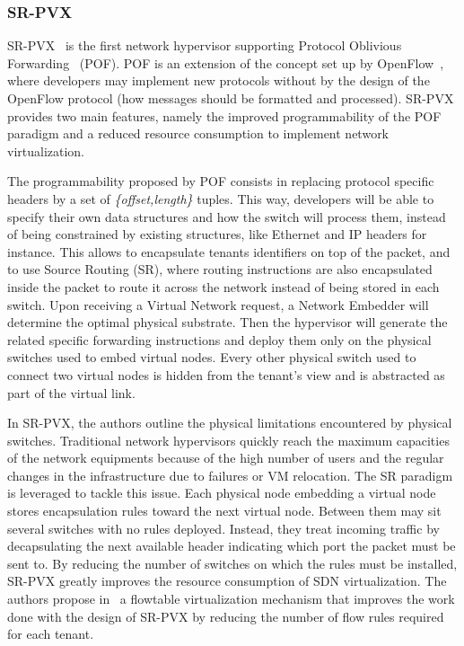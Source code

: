 \subsubsection{SR-PVX}
SR-PVX~\cite{PVX-Li2017} is the first network hypervisor supporting Protocol Oblivious Forwarding~\cite{pof-song2013} (POF). POF is an extension of the concept set up by OpenFlow~\cite{Openflow-McKeown2008}, where developers may implement new protocols without by the design of the OpenFlow protocol (\eg how messages should be formatted and processed).
SR-PVX provides two main features, namely the improved programmability of the POF paradigm and a reduced resource consumption to implement network virtualization.

The programmability proposed by POF consists in replacing protocol specific headers by a set of \textit{\{offset,length\}} tuples. This way, developers will be able to specify their own data structures and how the switch will process them, instead of being constrained by existing structures, like Ethernet and IP headers for instance. This allows to encapsulate tenants identifiers on top of the packet, and to  use Source Routing (SR), where routing instructions are also encapsulated inside the packet to route it across the network instead of being stored in each switch.
Upon receiving a Virtual Network request, a Network Embedder will determine the optimal physical substrate. Then the hypervisor will generate the related specific forwarding instructions and deploy them only on the physical switches used to embed virtual nodes. Every other physical switch used to connect two virtual nodes is hidden from the tenant's view and is abstracted as part of the virtual link.

In SR-PVX, the authors outline the physical limitations encountered by physical switches.
Traditional network hypervisors quickly reach the maximum capacities of the network equipments because of the high number of users and the regular changes in the infrastructure due to failures or VM relocation. The SR paradigm is leveraged to tackle this issue. Each physical node embedding a virtual node stores encapsulation rules toward the next virtual node. Between them may sit several switches with no rules deployed. Instead, they treat incoming traffic by decapsulating the next available header indicating which port the packet must be sent to. By reducing the number of switches on which the rules must be installed, SR-PVX greatly improves the resource consumption of SDN virtualization. The authors propose in~\cite{pvflow-Li2018} a flowtable virtualization mechanism that improves the work done with the design of SR-PVX by reducing the number of flow rules required for each tenant.
    

